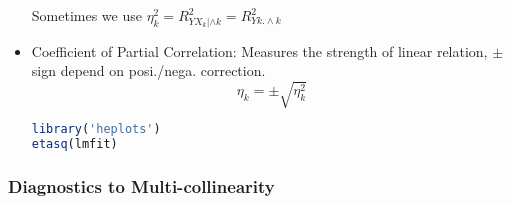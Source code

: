 \begin{itemize}[topsep=2pt,itemsep=2pt]
    Sometimes we use $ \eta^2_k=R^2_{YX_k|\wedge k}=R^2_{Yk.\wedge k} $

    \item Coefficient of Partial Correlation: Measures the strength of linear relation, $ \pm $ sign depend on posi./nega. correction.
    \begin{equation}
        \eta_k=\pm \sqrt{\eta^2_k} 
    \end{equation}
    
    
\begin{rcode}
\begin{lstlisting}[language=R]
library('heplots')
etasq(lmfit)
\end{lstlisting}

\end{rcode}

\end{itemize}











\subsubsection{Diagnostics to Multi-collinearity}\label{SubSubSectionDiagnosticsToMultiCollinearity}
    
